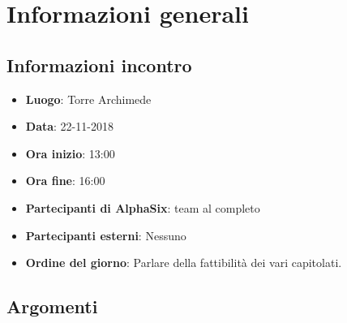 \newcommand{\documento}{\VI}
\newcommand{\nomedocumentofisico}{VI\_22-11-2018.pdf}
\newcommand{\redazione}{\LC}
\newcommand{\verifica}{\NC}
\newcommand{\approvazione}{\CV}
\newcommand{\versione}{1.0.0}
\newcommand{\uso}{Interno}
\newcommand{\destinateTo}{\gruppo}
\newcommand{\datacreazione}{25 novembre 2018}
\newcommand{\datamodifica}{26 novembre 2018}
\newcommand{\stato}{Approvato}

\def\TABELLE{false}	%
\def\FIGURE{false} 	%






    

    	
    
    \section{Informazioni generali}
		\subsection{Informazioni incontro}
			\begin{itemize}
				\item { \textbf{Luogo}:  Torre Archimede}
				\item { \textbf{Data}: 22-11-2018}
				\item { \textbf{Ora inizio}: 13:00}
				\item { \textbf{Ora fine}: 16:00}
				\item { \textbf{Partecipanti di AlphaSix}: team al completo}
				\item { \textbf{Partecipanti esterni}: Nessuno}
				\item { \textbf{Ordine del giorno}: Parlare della fattibilità dei vari capitolati.}
			\end{itemize}

        \subsection{Argomenti}
